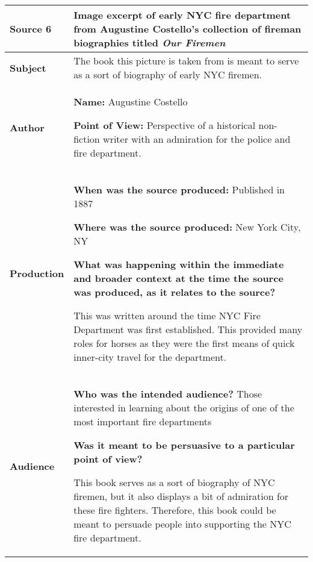 {\renewcommand{\arraystretch}{2}
\begin{longtable}{ | p{3cm} | p{13cm} | }
\hline

\textbf{Source 6} &
Image excerpt of early NYC fire department from Augustine Costello's collection of fireman biographies titled \emph{Our Firemen}
\\\hline

\textbf{Subject} &
The book this picture is taken from is meant to serve as a sort of biography of early NYC firemen.
\\\hline

\textbf{Author} &
\textbf{Name:} Augustine Costello \n

\textbf{Point of View:} Perspective of a historical non-fiction writer with an admiration for the police and fire department.
\\\hline

\textbf{Production} &
\textbf{When was the source produced:} Published in 1887

\textbf{Where was the source produced:} New York City, NY \n

\textbf{What was happening within the immediate and broader context at the time the source was produced, as it relates to the source? } \n

This was written around the time NYC Fire Department was first established.  This provided many roles for horses as they were the first means of quick inner-city travel for the department.
\\\hline

\textbf{Audience} &
\textbf{Who was the intended audience?} Those interested in learning about the origins of one of the most important fire departments \n 

\textbf{Was it meant to be persuasive to a particular point of view? } \n

This book serves as a sort of biography of NYC firemen, but it also displays a bit of admiration for these fire fighters.  Therefore, this book could be meant to persuade people into supporting the NYC fire department.
\\\hline
\end{longtable}}